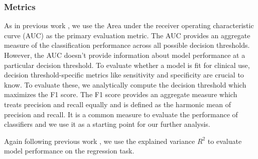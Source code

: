 \subsubsection{Metrics} \label{subsubsec:metrics}
As in previous work \cite{dsc} \cite{buschhertel}, we use the Area under the receiver operating characteristic curve (AUC) as the primary evaluation metric. The AUC provides an aggregate measure of the classification performance across all possible decision thresholds.\\
However, the AUC doesn't provide information about model performance at a particular decision threshold. To evaluate whether a model is fit for clinical use, decision threshold-specific metrics like sensitivity and specificity are crucial to know.
To evaluate these, we analytically compute the decision threshold which maximizes the F1 score. The F1 score provides an aggregate measure which treats precision and recall equally and is defined as the harmonic mean of precision and recall. It is a common measure to evaluate the performance of classifiers and we use it as a starting point for our further analysis. 

Again following previous work \cite{d2vsplicing} \cite{jha}, we use the explained variance $R^2$ to evaluate model performance on the regression task. 


